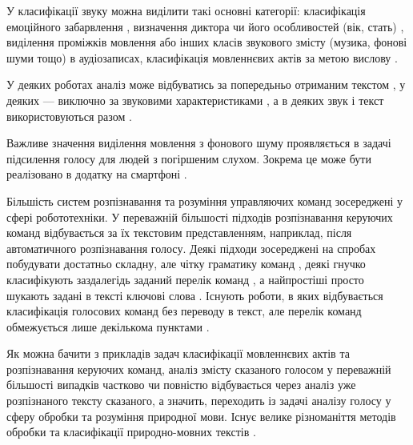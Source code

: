 У класифікації звуку можна виділити такі основні категорії: класифікація емоційного забарвлення \cite{Ververidis_2004,Ververidis_2004_2,Ververidis_2006,Kaya_2017,Deb_2016,Bhaskar_2015,Devillers_2015,Weisskirchen_2017,Sharma_2018,Ozseven_2018}, визначення диктора \cite{Rabotyagov_2006} чи його особливостей (вік, стать) \cite{Kaya_2017}, виділення проміжків мовлення \cite{Hussain_2018,Khonglah_2016,Benatan_2015,Priya_2012} або інших класів звукового змісту (музика, фонові шуми тощо) \cite{Hussain_2018,Boddapati_2017} в аудіозаписах, класифікація мовленнєвих актів за метою вислову \cite{Ko_2015,Choi_1999,Grosz_1995,En_2005,Kang_2013,Kim_2012,Lee_2002,Sridhar_2008,Webb_2005,Kang_2010,Hellbernd_2016,Su_2017}.

У деяких роботах аналіз може відбуватись за попередьньо отриманим текстом \cite{Ko_2015,Choi_1999,Grosz_1995,En_2005,Kang_2013,Kim_2012,Lee_2002,Webb_2005,Kang_2010}, у деяких ---  виключно за звуковими характеристиками \cite{Ververidis_2004,Ververidis_2004_2,Ververidis_2006,Kaya_2017,Deb_2016,Devillers_2015,Weisskirchen_2017,Sharma_2018,Hussain_2018,Khonglah_2016,Benatan_2015,Priya_2012,Boddapati_2017,Hellbernd_2016}, а в деяких звук і текст використовуються разом \cite{Bhaskar_2015,Sridhar_2008,Chowdhury_2018}.

Важливе значення виділення мовлення з фонового шуму проявляється в задачі підсилення голосу для людей з погіршеним слухом. Зокрема це може бути реалізовано в додатку на смартфоні \cite{Vashkevich_2018}.

Більшість систем розпізнавання та розуміння управляючих команд зосереджені у сфері робототехніки. У переважній більшості підходів розпізнавання керуючих команд відбувається за їх текстовим представленням, наприклад, після автоматичного розпізнавання голосу. Деякі підходи зосереджені на спробах побудувати достатньо складну, але чітку граматику команд \cite{Misra_2016,Fasola_2013,Eppe_2016}, деякі гнучко класифікують заздалегідь заданий перелік команд \cite{Yongda_2018}, а найпростіші просто шукають задані в тексті ключові слова \cite{Shwe_2003,Shulika_2018}. Існують роботи, в яких відбувається класифікація голосових команд без переводу в текст, але перелік команд обмежується лише декількома пунктами \cite{Shulika_2018,Gryshchuk_2006}.

Як можна бачити з прикладів задач класифікації мовленнєвих актів та розпізнавання керуючих команд, аналіз змісту сказаного голосом у переважній більшості випадків частково чи повністю відбувається через аналіз уже розпізнаного тексту сказаного, а значить, переходить із задачі аналізу голосу у сферу обробки та розуміння природної мови. Існує велике різноманіття методів обробки та класифікації природно-мовних текстів \cite{Mironczuk_2018,Altinel_2018,Hartmann_2018,Kim_2014,Britz_2015_2,Britz_2015,Marchenko_2005}.

